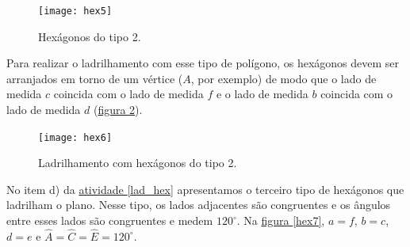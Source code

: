 \begin{figure}[H]
\centering
\texttt{[image: hex5]}
\caption{Hexágonos do tipo 2.}
\label{hex5}
\end{figure}


Para realizar o ladrilhamento com esse tipo de polígono, os hexágonos devem ser arranjados em torno de um vértice ($A$, por exemplo)  de modo que o lado de medida $c$ coincida com o lado de medida $f$ e o lado de medida $b$ coincida com o lado de medida $d$ (\hyperref[hex6]{figura \ref{hex6}}).

\begin{figure}[H]
\centering
\texttt{[image: hex6]}
\caption{Ladrilhamento com hexágonos do tipo 2.}
\label{hex6}
\end{figure}

No item d) da \hyperref[lad_hex]{atividade \ref{lad_hex}} apresentamos o terceiro tipo de hexágonos que ladrilham o plano. Nesse tipo, os lados adjacentes são congruentes e os ângulos entre esses lados são congruentes e medem $120^{\circ}$. Na \hyperref[hex7]{figura \ref{hex7}}, $a=f$, $b=c$, $d=e$ e $\hat{A}=\hat{C}=\hat{E}= 120^{\circ}$.

\clearmargin

